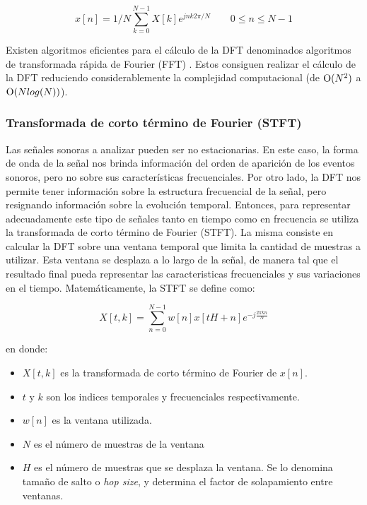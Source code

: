 \begin{equation}
\label{eqn:furier2}
	x[n] = {1}/{N}\sum_{k=0}^{N-1} X[k]e^{jnk2\pi/N} \qquad  0\leq n \leq N-1
\end{equation} 

Existen algoritmos eficientes para el cálculo de la DFT denominados algoritmos de transformada rápida de Fourier (FFT) \cite{fft}. Estos consiguen realizar el cálculo de la DFT reduciendo considerablemente la complejidad computacional (de $\textup{O}(N^{2})$ a $\textup{O}(Nlog(N))$).

\subsubsection{Transformada de corto término de Fourier (STFT)}

Las señales sonoras a analizar pueden ser no estacionarias. En este caso, la forma de onda de la señal nos brinda información del orden de aparición de los eventos sonoros, pero no sobre sus características frecuenciales. Por otro lado, la DFT nos permite tener información sobre la estructura frecuencial de la señal, pero resignando información sobre la evolución temporal. Entonces, para representar adecuadamente este tipo de señales tanto en tiempo como en frecuencia se utiliza la transformada de corto término de Fourier (STFT). La misma consiste en calcular la DFT sobre una ventana temporal que limita la cantidad de muestras a utilizar. Esta ventana se desplaza a lo largo de la señal, de manera tal que el resultado final pueda representar las caracteristicas frecuenciales y sus variaciones en el tiempo. Matemáticamente, la STFT se define como: 

\begin{equation}
\label{eqn:STFT}
	X[t,k] = \sum_{n = 0}^{N-1}w[n]x[tH+n]e^{-j\frac{2 \pi k n}{N}}
\end{equation}

en donde:

\begin{itemize}
    \item $X[t,k]$ es la transformada de corto término de Fourier de $x[n]$.
    \item $t$ y $k$ son los indices temporales y frecuenciales respectivamente.
    \item $w[n]$ es la ventana utilizada.
    \item $N$ es el número de muestras de la ventana
    \item $H$ es el número de muestras que se desplaza la ventana. Se lo denomina tamaño de salto o \textit{hop size}, y determina el factor de solapamiento entre ventanas. 
\end{itemize}

